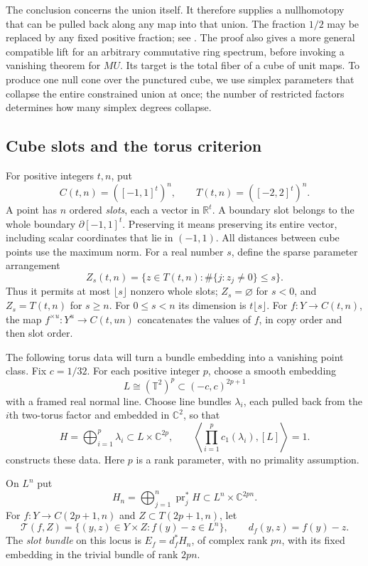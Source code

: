 The conclusion concerns the union itself.  It therefore supplies a
nullhomotopy that can be pulled back along any map into that union.
The fraction $1/2$ may be replaced by any fixed positive fraction;
see .  The proof also gives a
more general compatible lift for an arbitrary commutative ring
spectrum, before invoking a vanishing theorem for $MU$.  Its target is
the total fiber of a cube of unit maps.  To produce one null cone over
the punctured cube, we use simplex parameters that collapse the entire
constrained union at once; the number of restricted factors determines
how many simplex degrees collapse.

\subsection{Cube slots and the torus criterion}

For positive integers $t,n$, put
\[
 C(t,n)=([-1,1]^t)^n,\qquad T(t,n)=([-2,2]^t)^n.
\]
A point has $n$ ordered \emph{slots}, each a vector in $\mathbb R^t$.
A boundary slot belongs to the whole boundary $\partial[-1,1]^t$.
Preserving it means preserving its entire vector, including scalar
coordinates that lie in $(-1,1)$.  All distances between cube points
use the maximum norm.  For a real number $s$, define the sparse
parameter arrangement
\[
 Z_s(t,n)=\{z\in T(t,n):\#\{j:z_j\ne0\}\le s\}.
\]
Thus it permits at most $\lfloor s\rfloor$ nonzero whole slots;
$Z_s=\varnothing$ for $s<0$, and $Z_s=T(t,n)$ for $s\ge n$.
For $0\le s<n$ its dimension is $t\lfloor s\rfloor$.
For $f:Y\to C(t,n)$, the map $f^{\times u}:Y^u\to C(t,un)$
concatenates the values of $f$, in copy order and then slot order.

The following torus data will turn a bundle embedding into a vanishing
point class.  Fix $c=1/32$.  For each positive integer $p$, choose a
smooth embedding
\[
 L\cong(\mathbb T^2)^p\subset(-c,c)^{2p+1}
\]
with a framed real normal line.  Choose line bundles $\lambda_i$, each
pulled back from the $i$th two-torus factor and embedded in
$\mathbb C^2$, so that
\[
 H=\bigoplus_{i=1}^p\lambda_i\subset L\times\mathbb C^{2p},
 \qquad
 \left\langle\prod_{i=1}^p c_1(\lambda_i),[L]\right\rangle=1.
\]
 constructs these data.  Here $p$ is a rank
parameter, with no primality assumption.

\begin{notation}
\label{not:torus-bundle}
On $L^n$ put
\[
 H_n=\bigoplus_{j=1}^n\operatorname{pr}_j^*H
       \subset L^n\times\mathbb C^{2pn}.
\]
For $f:Y\to C(2p+1,n)$ and $Z\subset T(2p+1,n)$, let
\[
 \mathcal T(f,Z)=\{(y,z)\in Y\times Z:f(y)-z\in L^n\},
 \qquad d_f(y,z)=f(y)-z.
\]
The \emph{slot bundle} on this locus is $E_f=d_f^*H_n$, of complex
rank $pn$, with its fixed embedding in the trivial bundle of rank
$2pn$.
\end{notation}

